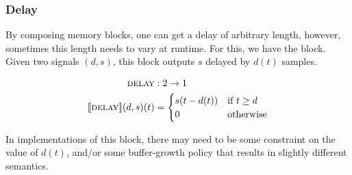 \subsubsection{Delay}
\label{sec:block_delay}

By composing memory blocks, one can get a delay of arbitrary length, however, sometimes this length needs to
vary at runtime. For this, we have the \Delay block. Given two signals $(d, s)$, this block
outputs $s$ delayed by $d(t)$ samples.

\begin{align*}
  \textsc{delay}                 & : 2 \rightarrow 1            \\
  \llbracket \textsc{delay} \rrbracket(d, s)(t) & = \begin{cases}
    s(t - d(t)) & \text{if } t \geq d \\
    0           & \text{otherwise}
  \end{cases}
\end{align*}

In implementations of this block, there may need to be some constraint on the value of
$d(t)$, and/or some buffer-growth policy that results in slightly different semantics.
